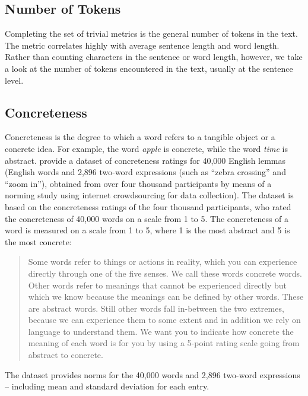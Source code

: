 \subsection{Number of Tokens}
Completing the set of trivial metrics is the general number of tokens in the text. The metric correlates highly with average sentence length and word length. Rather than counting characters in the sentence or word length, however, we take a look at the number of tokens encountered in the text, usually at the sentence level. 

\subsection{Concreteness}
\label{concreteness}
Concreteness is the degree to which a word refers to a tangible object or a concrete idea. For example, the word \textit{apple} is concrete, while the word \textit{time} is abstract. \cite{brysbaert2014concreteness} provide a dataset of concreteness ratings for 40,000 English lemmas (English words and 2,896 two-word expressions (such as ``zebra crossing'' and ``zoom in''), obtained from over four thousand participants by means of a norming study using internet crowdsourcing for data collection). The dataset is based on the concreteness ratings of the four thousand participants, who rated the concreteness of 40,000 words on a scale from 1 to 5.
The concreteness of a word is measured on a scale from 1 to 5, where 1 is the most abstract and 5 is the most concrete: 

\begin{quote}
    Some words refer to things or actions in reality, which you can experience directly through one of the five senses. We call these words concrete words. Other words refer to meanings that cannot be experienced directly but which we know because the meanings can be defined by other words. These are abstract words. Still other words fall in-between the two extremes, because we can experience them to some extent and in addition we rely on language to understand them. We want you to indicate how concrete the meaning of each word is for you by using a 5-point rating scale going from abstract to concrete.
\end{quote}

The dataset provides norms for the 40,000 words and 2,896 two-word expressions -- including mean and standard deviation for each entry.

